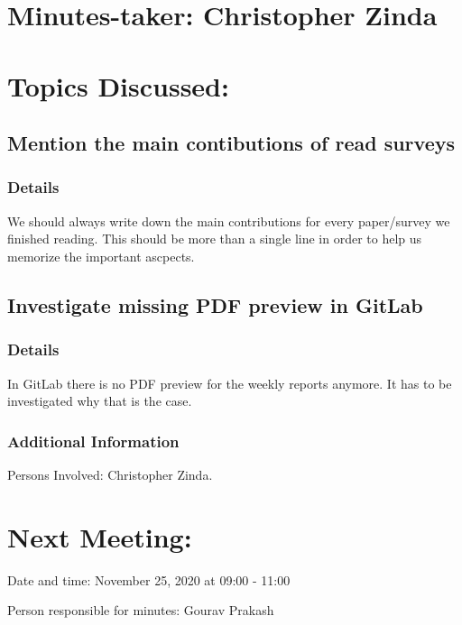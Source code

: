 \documentclass[11pt]{meetingmins}
\begin{document}
\maketitle

\section{Minutes-taker: Christopher Zinda}

\section{Topics Discussed:}

\subsection{Mention the main contibutions of read surveys}
    \subsubsection{Details}
        \begin{hiddensubitems}
            \item
                We should always write down the main contributions for every paper/survey we finished reading. This should be more than a single line in order to help us memorize the important ascpects.
        \end{hiddensubitems}       

\subsection{Investigate missing PDF preview in GitLab}
    \subsubsection{Details}
        \begin{hiddensubitems}
            \item
                In GitLab there is no PDF preview for the weekly reports anymore. It has to be investigated why that is the case.
        \end{hiddensubitems}
    \subsubsection{Additional Information}
        \begin{hiddensubitems}
            \item
                Persons Involved: Christopher Zinda.
        \end{hiddensubitems}

\section{Next Meeting:}
    \begin{hiddensubitems}
        \item
            Date and time: November 25, 2020 at 09:00 - 11:00
        \item
            Person responsible for minutes: Gourav Prakash
    \end{hiddensubitems}
\end{document}
